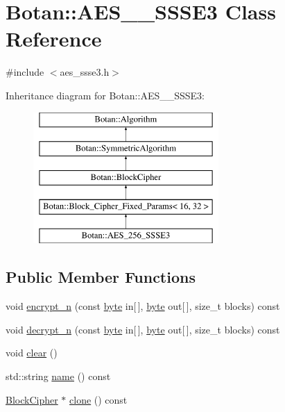 \hypertarget{classBotan_1_1AES__256__SSSE3}{\section{Botan\-:\-:A\-E\-S\-\_\-\_\-\-S\-S\-S\-E3 Class Reference}
\label{classBotan_1_1AES__256__SSSE3}
}


{\ttfamily \#include $<$aes\-\_\-ssse3.\-h$>$}

Inheritance diagram for Botan\-:\-:A\-E\-S\-\_\-\_\-\-S\-S\-S\-E3\-:\begin{figure}[H]
\begin{center}
\leavevmode
\includegraphics[height=5.000000cm]{classBotan_1_1AES__256__SSSE3}
\end{center}
\end{figure}
\subsection*{Public Member Functions}
\begin{DoxyCompactItemize}
\item 
void \hyperlink{classBotan_1_1AES__256__SSSE3_a791648bc9a95502728f77ba4693f633d}{encrypt\-\_\-n} (const \hyperlink{namespaceBotan_a7d793989d801281df48c6b19616b8b84}{byte} in\mbox{[}$\,$\mbox{]}, \hyperlink{namespaceBotan_a7d793989d801281df48c6b19616b8b84}{byte} out\mbox{[}$\,$\mbox{]}, size\-\_\-t blocks) const 
\item 
void \hyperlink{classBotan_1_1AES__256__SSSE3_adc7c212e6853b5410f18d137e3664d0b}{decrypt\-\_\-n} (const \hyperlink{namespaceBotan_a7d793989d801281df48c6b19616b8b84}{byte} in\mbox{[}$\,$\mbox{]}, \hyperlink{namespaceBotan_a7d793989d801281df48c6b19616b8b84}{byte} out\mbox{[}$\,$\mbox{]}, size\-\_\-t blocks) const 
\item 
void \hyperlink{classBotan_1_1AES__256__SSSE3_afb5b90c19f22dfc26a230b0413f70ba9}{clear} ()
\item 
std\-::string \hyperlink{classBotan_1_1AES__256__SSSE3_a02db8d0f406ec392c419cf64655de779}{name} () const 
\item 
\hyperlink{classBotan_1_1BlockCipher}{Block\-Cipher} $\ast$ \hyperlink{classBotan_1_1AES__256__SSSE3_a03c09d155e2c83d5d164e18837816c24}{clone} () const 
\end{DoxyCompactItemize}
